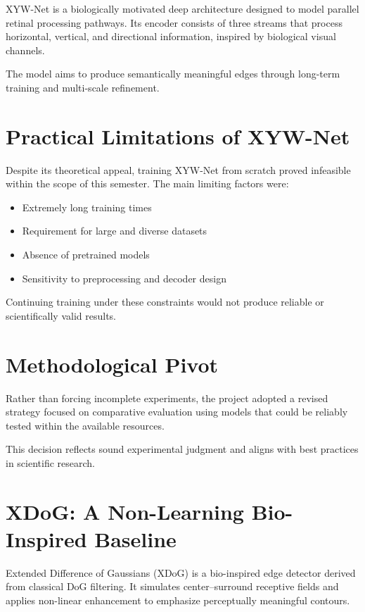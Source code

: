 \documentclass[12pt]{article}
\begin{document}
XYW-Net is a biologically motivated deep architecture designed to model parallel
retinal processing pathways. Its encoder consists of three streams that process
horizontal, vertical, and directional information, inspired by biological visual
channels.

The model aims to produce semantically meaningful edges through long-term training
and multi-scale refinement.

\section{Practical Limitations of XYW-Net}

Despite its theoretical appeal, training XYW-Net from scratch proved infeasible
within the scope of this semester. The main limiting factors were:
\begin{itemize}
\item Extremely long training times
\item Requirement for large and diverse datasets
\item Absence of pretrained models
\item Sensitivity to preprocessing and decoder design
\end{itemize}

Continuing training under these constraints would not produce reliable or
scientifically valid results.

\section{Methodological Pivot}

Rather than forcing incomplete experiments, the project adopted a revised
strategy focused on comparative evaluation using models that could be reliably
tested within the available resources.

This decision reflects sound experimental judgment and aligns with best practices
in scientific research.

\section{XDoG: A Non-Learning Bio-Inspired Baseline}

Extended Difference of Gaussians (XDoG) is a bio-inspired edge detector derived from
classical DoG filtering. It simulates center--surround receptive fields and applies
non-linear enhancement to emphasize perceptually meaningful contours.
\end{document}
